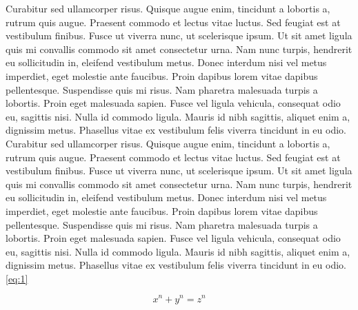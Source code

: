 \documentclass[12pt,letterpaper,oneside]{book}
\begin{document}
Curabitur sed ullamcorper risus. Quisque augue enim, tincidunt a lobortis a, rutrum quis augue. Praesent commodo et lectus vitae luctus. Sed feugiat est at vestibulum finibus. Fusce ut viverra nunc, ut scelerisque ipsum. Ut sit amet ligula quis mi convallis commodo sit amet consectetur urna. Nam nunc turpis, hendrerit eu sollicitudin in, eleifend vestibulum metus. Donec interdum nisi vel metus imperdiet, eget molestie ante faucibus. Proin dapibus lorem vitae dapibus pellentesque. Suspendisse quis mi risus. Nam pharetra malesuada turpis a lobortis. Proin eget malesuada sapien. Fusce vel ligula vehicula, consequat odio eu, sagittis nisi. Nulla id commodo ligula. Mauris id nibh sagittis, aliquet enim a, dignissim metus. Phasellus vitae ex vestibulum felis viverra tincidunt in eu odio. 
Curabitur sed ullamcorper risus. Quisque augue enim, tincidunt a lobortis a, rutrum quis augue. Praesent commodo et lectus vitae luctus. Sed feugiat est at vestibulum finibus. Fusce ut viverra nunc, ut scelerisque ipsum. Ut sit amet ligula quis mi convallis commodo sit amet consectetur urna. Nam nunc turpis, hendrerit eu sollicitudin in, eleifend vestibulum metus. Donec interdum nisi vel metus imperdiet, eget molestie ante faucibus. Proin dapibus lorem vitae dapibus pellentesque. Suspendisse quis mi risus. Nam pharetra malesuada turpis a lobortis. Proin eget malesuada sapien. Fusce vel ligula vehicula, consequat odio eu, sagittis nisi. Nulla id commodo ligula. Mauris id nibh sagittis, aliquet enim a, dignissim metus. Phasellus vitae ex vestibulum felis viverra tincidunt in eu odio. \ref{eq:1}

\begin{equation}
\label{eq:1}
x^n + y^n = z^n
\end{equation}
\end{document}
